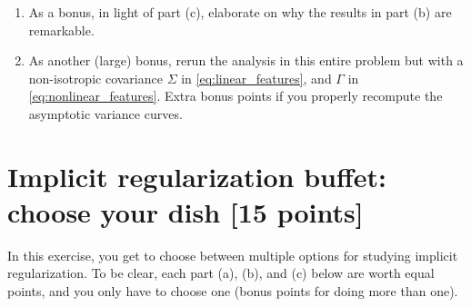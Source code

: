 \documentclass{article}
\begin{document}
\begin{enumerate}[label=(\alph*)]
\item As a bonus, in light of part (c), elaborate on why the results in part (b)
  are remarkable. 

\item As another (large) bonus, rerun the analysis in this entire problem but
  with a non-isotropic covariance $\Sigma$ in \eqref{eq:linear_features}, and
  $\Gamma$ in \eqref{eq:nonlinear_features}. Extra bonus points if you properly
  recompute the asymptotic variance curves. 
\end{enumerate}

\section{Implicit regularization buffet: choose your dish [15 points]} 

In this exercise, you get to choose between multiple options for studying
implicit regularization. To be clear, each part (a), (b), and (c) below are
worth equal points, and you only have to choose one (bonus points for doing more
than one). 
\end{document}
